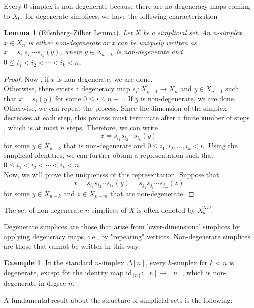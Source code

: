 \documentclass[11pt]{article}
\theoremstyle{definition}
\newtheorem{example}[definition]{Example}
\theoremstyle{plain}
\newtheorem{lemma}[definition]{Lemma}
\begin{document}
Every 0-simplex is non-degenerate because there are no degeneracy maps coming to $X_0$.
for degenerate simplices, we have the following characterization
\begin{lemma}[Eilenberg–Zilber Lemma]
    Let $X$ be a simplicial set. An n-simplex $x \in X_n$ is either non-degenerate or   x can be   uniquely written as $x = s_{i_1} s_{i_2} \cdots s_{i_k}(y)$, where $y \in X_{n-k}$ is non-degenerate and $0 \leq i_1 < i_2 < \cdots < i_k < n$.
\end{lemma}
\begin{proof}
    Now , if $x$ is non-degenerate, we are done. \\
    Otherwise, there exists a degeneracy map $s_i : X_{n-1} \to X_n$ and $y \in X_{n-1}$ such that $x = s_i(y)$ for some $0 \leq i \leq n-1$. If $y$ is non-degenerate, we are done. Otherwise, we can repeat the process. Since the dimension of the simplex decreases at each step, this process must terminate after a finite number of steps , which is at most $n$ steps. Therefore, we can write
    \[
        x = s_{i_1} s_{i_2} \cdots s_{i_k}(y)
    \]
    for some $y \in X_{n-k}$ that is non-degenerate and $0 \leq i_1, i_2, \ldots, i_k < n$.
    Using the simplicial identities, we can further obtain a representation such that $0 \leq i_1 < i_2 < \cdots < i_k < n$.\\

    Now, we will prove the uniqueness of this representation. Suppose that
    \[
        x = s_{i_1} s_{i_2} \cdots s_{i_k}(y) = s_{j_1} s_{j_2} \cdots s_{j_m}(z)
    \]
    for some $y \in X_{n-k}$ and $z \in X_{n-m}$ that are non-degenerate.

\end{proof}



The set of non-degenerate $n$-simplices of $X$ is often denoted by $X_n^{ND}$.

Degenerate simplices are those that arise from lower-dimensional simplices by applying degeneracy maps, i.e., by "repeating" vertices. Non-degenerate simplices are those that cannot be written in this way.

\begin{example}
    In the standard $n$-simplex $\Delta[n]$, every $k$-simplex for $k < n$ is degenerate, except for the identity map $\mathrm{id}_{[n]} : [n] \to [n]$, which is non-degenerate in degree $n$.
\end{example}

A fundamental result about the structure of simplicial sets is the following:
\end{document}
